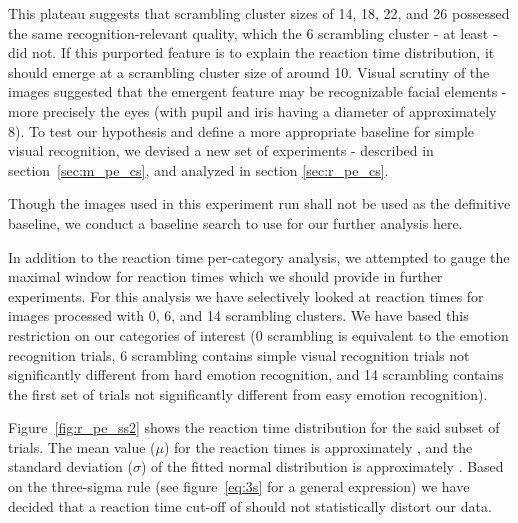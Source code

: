 	    This plateau suggests that scrambling cluster sizes of \SI{14}{\pixel}, \SI{18}{\pixel}, \SI{22}{\pixel}, and \SI{26}{\pixel} possessed the same recognition-relevant quality, which the \SI{6}{\pixel} scrambling cluster - at least - did not.
	    If this purported feature is to explain the reaction time distribution, it should emerge at a scrambling cluster size of around \SI{10}{\pixel}.
	    Visual scrutiny of the images suggested that the emergent feature may be recognizable facial elements - more precisely the eyes (with pupil and iris having a diameter of approximately \SI{8}{\pixel}).
	    To test our hypothesis and define a more appropriate baseline for simple visual recognition, we devised a new set of experiments - described in section~\ref{sec:m_pe_cs}, and analyzed in section \ref{sec:r_pe_cs}.
	    
	    Though the images used in this experiment run shall not be used as the definitive baseline, we conduct a baseline search to use for our further analysis here.
	    
	    \begin{table}

	    \end{table} 
	    
	    In addition to the reaction time per-category analysis, we attempted to gauge the maximal window for reaction times which we should provide in further experiments.
	    For this analysis we have selectively looked at reaction times for images processed with \SI{0}{\pixel}, \SI{6}{\pixel}, and \SI{14}{\pixel} scrambling clusters.
	    We have based this restriction on our categories of interest 
	    (\SI{0}{\pixel} scrambling is equivalent to the emotion recognition trials, \SI{6}{\pixel} scrambling contains simple visual recognition trials not significantly different from hard emotion recognition, and \SI{14}{\pixel} scrambling contains the first set of trials not significantly different from easy emotion recognition).
	    
	    Figure~\ref{fig:r_pe_ss2} shows the reaction time distribution for the said subset of trials.
	    The mean value ($\mu$) for the reaction times is approximately , 
	    and the standard deviation ($\sigma$) of the fitted normal distribution is approximately .
	    Based on the three-sigma rule (see figure~\ref{eq:3s} for a general expression) we have decided that a reaction time cut-off of  should not statistically distort our data.
	    
